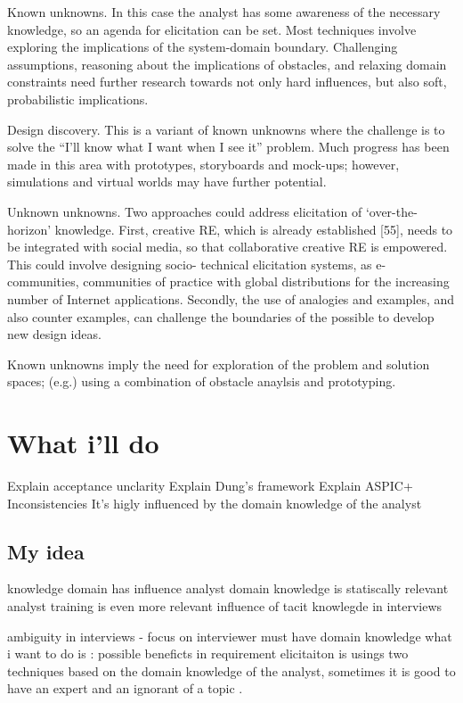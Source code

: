 \documentclass[]{llncs}
\begin{document}
Known unknowns. In this case the analyst has some awareness of the
necessary knowledge, so an agenda for elicitation can be set. Most
techniques involve exploring the implications of the system-domain
boundary. Challenging assumptions, reasoning about the implications of
obstacles, and relaxing domain constraints need further research towards
not only hard influences, but also soft, probabilistic implications.

Design discovery. This is a variant of known unknowns where the
challenge is to solve the ``I'll know what I want when I see it''
problem. Much progress has been made in this area with prototypes,
storyboards and mock-ups; however, simulations and virtual worlds may
have further potential.

Unknown unknowns. Two approaches could address elicitation of
`over-the-horizon' knowledge. First, creative RE, which is already
established {[}55{]}, needs to be integrated with social media, so that
collaborative creative RE is empowered. This could involve designing
socio- technical elicitation systems, as e-communities, communities of
practice with global distributions for the increasing number of Internet
applications. Secondly, the use of analogies and examples, and also
counter examples, can challenge the boundaries of the possible to
develop new design ideas.

Known unknowns imply the need for exploration of the problem and
solution spaces; (e.g.) using a combination of obstacle anaylsis and
prototyping.

\hypertarget{what-ill-do}{%
\section{What i'll do}\label{what-ill-do}}

Explain acceptance unclarity Explain Dung's framework Explain ASPIC+
Inconsistencies It's higly influenced by the domain knowledge of the
analyst

\hypertarget{my-idea}{%
\subsection{My idea}\label{my-idea}}

knowledge domain has influence analyst domain knowledge is statiscally
relevant analyst training is even more relevant influence of tacit
knowlegde in interviews

ambiguity in interviews - focus on interviewer must have domain
knowledge what i want to do is : possible beneficts in requirement
elicitaiton is usings two techniques based on the domain knowledge of
the analyst, sometimes it is good to have an expert and an ignorant of a
topic .
\end{document}

